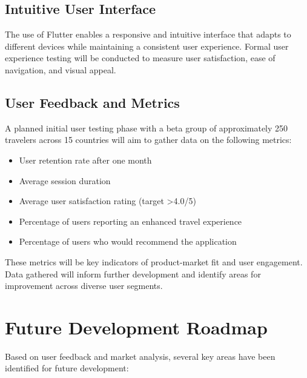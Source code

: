 \documentclass[11pt, a4paper]{article}
\begin{document}
\subsection{Intuitive User Interface}

The use of Flutter enables a responsive and intuitive interface that adapts to different devices while maintaining a consistent user experience. Formal user experience testing will be conducted to measure user satisfaction, ease of navigation, and visual appeal.

\subsection{User Feedback and Metrics}

A planned initial user testing phase with a beta group of approximately 250 travelers across 15 countries will aim to gather data on the following metrics:

\begin{itemize}
    \item User retention rate after one month
    \item Average session duration
    \item Average user satisfaction rating (target >4.0/5)
    \item Percentage of users reporting an enhanced travel experience
    \item Percentage of users who would recommend the application
\end{itemize}

These metrics will be key indicators of product-market fit and user engagement. Data gathered will inform further development and identify areas for improvement across diverse user segments.

\section{Future Development Roadmap}

Based on user feedback and market analysis, several key areas have been identified for future development:
\end{document}
